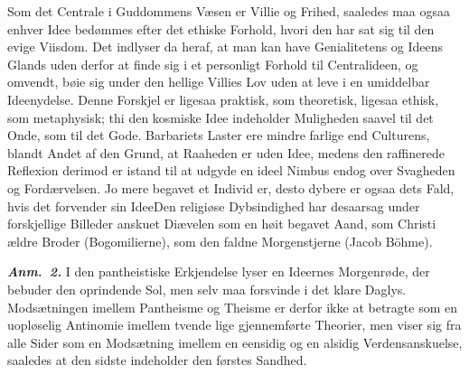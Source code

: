 \documentclass[12pt]{book}
\newcommand{\anm}[1]{\emph{\textbf{Anm.~#1.}}}
\newcommand{\opage}[1]{\marginnote{\footnotesize\textit{[#1]}}}
\begin{document}
Som det Centrale i Guddommens Væsen er Villie og Frihed, saaledes maa ogsaa enhver Idee
bedømmes efter det ethiske Forhold, hvori den har sat sig til den evige Viisdom. Det
indlyser da heraf, at man kan have Genialitetens og Ideens Glands uden derfor at finde
sig i et personligt Forhold til Centralideen, og omvendt, bøie sig under den hellige
Villies Lov uden at leve i en umiddelbar Ideenydelse. Denne
\opage{278} %
Forskjel er ligesaa praktisk, som theoretisk, ligesaa ethisk, som metaphysisk; thi den
kosmiske Idee indeholder Muligheden saavel til det Onde, som til det Gode. Barbariets
Laster ere mindre farlige end Culturens, blandt Andet af den Grund, at Raaheden er uden
Idee, medens den raffinerede Reflexion derimod er istand til at udgyde en ideel Nimbus
endog over Svagheden og Fordærvelsen. Jo mere begavet et Individ er, desto dybere er
ogsaa dets Fald, hvis det forvender sin Idee\quad Den religiøse Dybsindighed har
desaarsag under forskjellige Billeder anskuet Diævelen som en høit begavet Aand, som
Christi ældre Broder (Bogomilierne), som den faldne Morgenstjerne (Jacob Böhme).

\anm{2} I den pantheistiske Erkjendelse lyser en Ideernes Morgenrøde, der bebuder den
oprindende Sol, men selv maa forsvinde i det klare Daglys. Modsætningen imellem
Pantheisme og Theisme er derfor ikke at betragte som en uopløselig Antinomie imellem
tvende lige gjennemførte Theorier, men viser sig fra alle Sider som en Modsætning
imellem en eensidig og en alsidig Verdensanskuelse, saaledes at den sidste indeholder
den førstes Sandhed.
\end{document}
